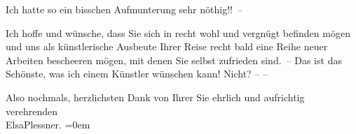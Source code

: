 \pstart
           Ich hatte so ein bisschen Aufmunterung sehr nöthig!! –\pend
           
\pstart
           {\pb}Ich hoffe und wünsche, dass Sie sich in \label{K_L03696-5v}\label{K_L03696-5} recht wohl und
                    vergnügt befinden mögen und uns als künstlerische Ausbeute Ihrer Reise recht
                    bald eine Reihe neuer Arbeiten bescheeren mögen, mit denen Sie selbst zufrieden
                    sind. – Das ist das Schönste, was ich einem Künstler wünschen kann! Nicht? –
                    –\pend
           
\pstart
           Also nochmals, herz{\pb}lichsten Dank von Ihrer
                    Sie ehrlich und aufrichtig verehrenden{\\[\baselineskip]}\spacefill\mbox{ElsaPlessner.}\pend
           \leftskip=0em{}\endnumbering{}  \newcommand{\dateiname}{L03696}\newcommand{\titel}{Elsa Plessner an Arthur Schnitzler, 30. 5. [1897]}\newcommand{\editorInnen}{Kurt Ifkovits, Selma Jahnke und Martin Anton Müller}

